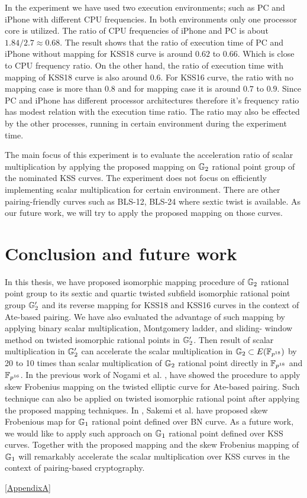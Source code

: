 In the experiment we have used two execution environments; such as PC and iPhone with different CPU frequencies. 
In both environments only one processor core is utilized.
 The ratio of CPU frequencies of  iPhone and PC is about $1.84 / 2.7 \approx 0.68$. 
The result  shows that the ratio of execution time of PC and iPhone without mapping  for KSS18 curve is around $0.62$ to $0.66$.
Which is close to CPU frequency ratio.
On the other hand, the ratio of execution time with mapping  of KSS18 curve is also around $0.6$. 
For KSS16 curve, the ratio with no mapping case is more than $0.8$ and for mapping case it is around $0.7$ to $0.9$.   
Since PC and iPhone has different processor architectures therefore it's frequency ratio has modest relation with the execution time ratio. 
The ratio may also be effected by the other processes, running in certain environment during the experiment time.

The main focus of this experiment is to evaluate the  acceleration ratio of scalar multiplication by applying the proposed mapping on ${\mathbb{G}}_{2}$ rational point group of the nominated KSS curves. The experiment does not focus on efficiently implementing scalar multiplication for certain environment. There are other pairing-friendly curves such as BLS-12, BLS-24 \cite{JC:FreScoTes10} where sextic twist is available. As our future work, we will try to apply the proposed mapping on those curves.

\section{Conclusion and future work}
In this thesis, we have proposed isomorphic mapping procedure of ${\mathbb{G}}_{2}$ rational point group to its sextic and quartic twisted subfield isomorphic rational point group ${\mathbb{G}}_{2}'$  and its reverse mapping for KSS18 and KSS16 curves in the context of Ate-based pairing. 
We have also evaluated the advantage of such mapping by applying binary scalar multiplication, Montgomery ladder, and sliding- window method on twisted isomorphic rational points in ${\mathbb{G}}_{2}'$. 
Then result of  scalar multiplication in ${\mathbb{G}}_{2}'$ can accelerate the scalar multiplication in ${\mathbb{G}}_{2} \subset E(\mathbb{F}_{p^{18}})$ by   20 to 10 times than scalar multiplication of ${\mathbb{G}}_{2}$ rational point directly in $\mathbb{F}_{p^{18}}$ and $\mathbb{F}_{p^{16}}$. 
In the previous work of Nogami et al. \cite{DBLP:journals/ieicet/NogamiSONAM09}, have showed the procedure to apply skew Frobenius mapping on the twisted elliptic curve for Ate-based pairing. Such technique can also be applied on twisted isomorphic rational point after applying the proposed mapping techniques.
In \cite{CANS:SNOKM08},  Sakemi et al.  have proposed skew Frobenious map for ${\mathbb{G}}_{1}$ rational point defined over BN curve.
As a future work, we would like to apply such approach on ${\mathbb{G}}_{1}$ rational point defined over KSS curves. Together with the proposed mapping and the skew Frobenius mapping of ${\mathbb{G}}_{1}$ will remarkably accelerate the scalar multiplication over KSS curves in the context of pairing-based cryptography.  

\ref{AppendixA}